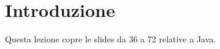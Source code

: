\documentclass{article}
\begin{document}
\section{Introduzione}
Questa lezione copre le slides da 36 a 72 relative a Java.
%
%
%
%
\end{document}
